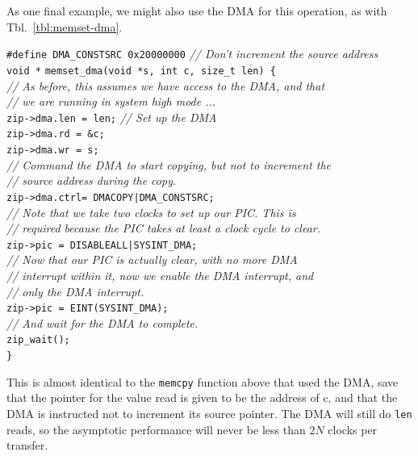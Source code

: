 \documentclass{gqtekspec}
\begin{document}
As one final example, we might also use the DMA for this operation, as with
Tbl.~\ref{tbl:memset-dma}.
\begin{table}\begin{center}
\begin{tabbing}
{\tt \#define DMA\_CONSTSRC 0x20000000} {\em // Don't increment the source address}
\\
{\tt void *} \= {\tt memset\_dma(void *s, int c, size\_t len) \{} \\
	\> {\em // As before, this assumes we have access to the DMA, and that}\\
	\> {\em // we are running in system high mode ...}\\
	\> {\tt zip->dma.len = len;} \= {\em // Set up the DMA }\\
	\> {\tt zip->dma.rd  = \&c;}\\
	\> {\tt zip->dma.wr  = s;}\\
	\> {\em // Command the DMA to start copying, but not to increment the} \\
	\> {\em // source address during the copy.} \\
	\> {\tt zip->dma.ctrl= DMACOPY|DMA\_CONSTSRC;} \\
	\> {\em // Note that we take two clocks to set up our PIC.  This is }\\
	\> {\em // required because the PIC takes at least a clock cycle to clear.} \\
	\> {\tt zip->pic = DISABLEALL|SYSINT\_DMA;} \\
	\> {\em // Now that our PIC is actually clear, with no more DMA }\\
	\> {\em // interrupt within it, now we enable the DMA interrupt, and}\\
	\> {\em // only the DMA interrupt.}\\
	\> {\tt zip->pic = EINT(SYSINT\_DMA);}\\
	\> {\em // And wait for the DMA to complete.} \\
	\> {\tt zip\_wait();}\\
{\tt \}}
\end{tabbing}
\caption{Example Memset code, only this time with the DMA}\label{tbl:memset-dma}
\end{center}\end{table}
This is almost identical to the {\tt memcpy} function above that used the
DMA, save that the pointer for the value read is given to be the address
of c, and that the DMA is instructed not to increment its source pointer.
The DMA will still do {\tt len} reads, so the asymptotic performance will never
be less than $2N$ clocks per transfer.
\end{document}
